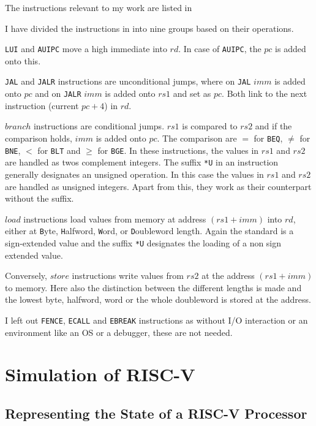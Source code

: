 The instructions relevant to my work are listed in


I have divided the instructions in 
into nine groups based on their operations.

\texttt{LUI} and \texttt{AUIPC} move a high immediate into $rd$. In
case of \texttt{AUIPC}, the $pc$ is added onto this.

\texttt{JAL} and \texttt{JALR} instructions are unconditional jumps,
where on \texttt{JAL} $imm$ is added onto $pc$ and on \texttt{JALR}
$imm$ is added onto $rs1$ and set as $pc$. Both link to the next
instruction (current $pc + 4$) in $rd$.

$branch$ instructions are conditional jumps. $rs1$ is compared to
$rs2$ and if the comparison holds, $imm$ is added onto $pc$. The
comparison are $=$ for \texttt{BEQ}, $\neq$ for \texttt{BNE}, $<$ for
\texttt{BLT} and $\ge$ for \texttt{BGE}. In these instructions, the
values in $rs1$ and $rs2$ are handled as twos complement integers.
The suffix \texttt{*U} in an instruction generally designates an
unsigned operation. In this case the values in $rs1$ and $rs2$ are
handled as unsigned integers. Apart from this, they work as their
counterpart without the suffix.

$load$ instructions load values from memory at address $(rs1+imm)$
into $rd$, either at \texttt{B}yte, \texttt{H}alfword, \texttt{W}ord,
or \texttt{D}oubleword length. Again the standard is a sign-extended
value and the suffix \texttt{*U} designates the loading of a non sign
extended value.

Conversely, $store$ instructions write values from $rs2$ at the
address $(rs1+imm)$ to memory. Here also the distinction between the
different lengths is made and the lowest byte, halfword, word or the
whole doubleword is stored at the address.

I left out \texttt{FENCE}, \texttt{ECALL} and \texttt{EBREAK}
instructions as without I/O interaction or an environment like an OS
or a debugger, these are not needed.

\section{Simulation of RISC-V}\label{sec:simulation}
 \cite{repoSim}

\subsection{Representing the State of a RISC-V Processor}

